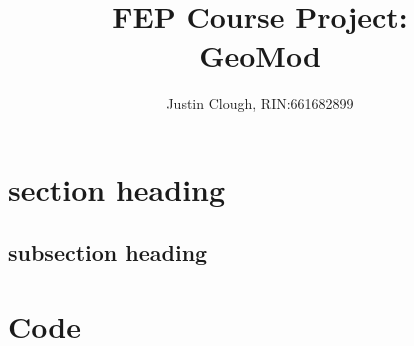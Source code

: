 \documentclass[a4paper, 12pt]{article}
\author{Justin Clough, RIN:661682899}
\title{FEP Course Project: \\
        GeoMod}
\begin{document}
\maketitle

\section*{section heading}

\subsection*{subsection heading} \label{sec:sub:label}

\newpage
\section*{Code} \label{sec:code}


\end{document}

